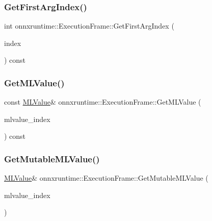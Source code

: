 \subsubsection{\texorpdfstring{Get\+First\+Arg\+Index()}{GetFirstArgIndex()}}
{\footnotesize\ttfamily int onnxruntime\+::\+Execution\+Frame\+::\+Get\+First\+Arg\+Index (\begin{DoxyParamCaption}\item[{\mbox{\hyperlink{namespaceonnxruntime_af8773b5c12b5d8fd9292eb2e268df760}{onnxruntime\+::\+Node\+Index}}}]{index }\end{DoxyParamCaption}) const\hspace{0.3cm}{\ttfamily [inline]}}

\mbox{\label{classonnxruntime_1_1ExecutionFrame_a1c8d41c9c63bd2f2d3756278a9c48804}} 
\subsubsection{\texorpdfstring{Get\+M\+L\+Value()}{GetMLValue()}}
{\footnotesize\ttfamily const \mbox{\hyperlink{classonnxruntime_1_1MLValue}{M\+L\+Value}}\& onnxruntime\+::\+Execution\+Frame\+::\+Get\+M\+L\+Value (\begin{DoxyParamCaption}\item[{int}]{mlvalue\+\_\+index }\end{DoxyParamCaption}) const\hspace{0.3cm}{\ttfamily [inline]}}

\mbox{\label{classonnxruntime_1_1ExecutionFrame_acf85178795ad4f8928a59d1a9d633969}} 
\subsubsection{\texorpdfstring{Get\+Mutable\+M\+L\+Value()}{GetMutableMLValue()}}
{\footnotesize\ttfamily \mbox{\hyperlink{classonnxruntime_1_1MLValue}{M\+L\+Value}}\& onnxruntime\+::\+Execution\+Frame\+::\+Get\+Mutable\+M\+L\+Value (\begin{DoxyParamCaption}\item[{int}]{mlvalue\+\_\+index }\end{DoxyParamCaption})\hspace{0.3cm}{\ttfamily [inline]}}

